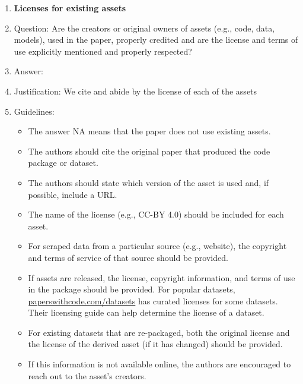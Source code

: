 \documentclass{article}
\theoremstyle{plain}
\theoremstyle{definition}
\theoremstyle{remark}
\begin{document}
\begin{enumerate}
\item {\bf Licenses for existing assets}
    \item[] Question: Are the creators or original owners of assets (e.g., code, data, models), used in the paper, properly credited and are the license and terms of use explicitly mentioned and properly respected?
    \item[] Answer: \answerYes{} %
    \item[] Justification: We cite and abide by the license of each of the assets
    \item[] Guidelines:
    \begin{itemize}
        \item The answer NA means that the paper does not use existing assets.
        \item The authors should cite the original paper that produced the code package or dataset.
        \item The authors should state which version of the asset is used and, if possible, include a URL.
        \item The name of the license (e.g., CC-BY 4.0) should be included for each asset.
        \item For scraped data from a particular source (e.g., website), the copyright and terms of service of that source should be provided.
        \item If assets are released, the license, copyright information, and terms of use in the package should be provided. For popular datasets, \url{paperswithcode.com/datasets} has curated licenses for some datasets. Their licensing guide can help determine the license of a dataset.
        \item For existing datasets that are re-packaged, both the original license and the license of the derived asset (if it has changed) should be provided.
        \item If this information is not available online, the authors are encouraged to reach out to the asset's creators.
    \end{itemize}


\end{enumerate}
\end{document}
